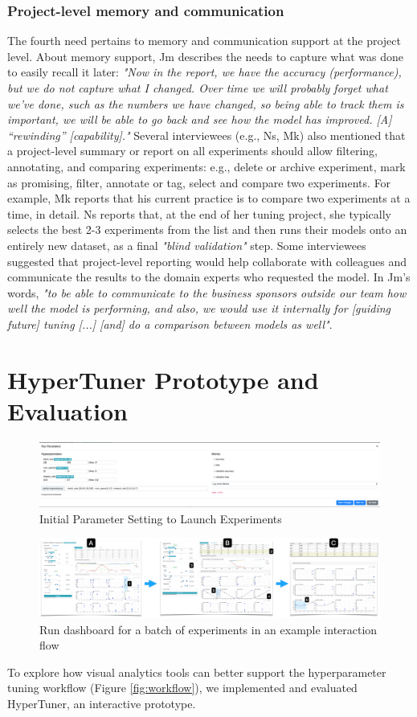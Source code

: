\documentclass[preprint]{vgtc}        %
\begin{document}
\subsubsection{Project-level memory and communication}
The fourth need pertains to memory and communication support at the project level. About memory support, Jm describes the needs to capture what was done to easily recall it later: \textit{"Now in the report, we have the accuracy (performance), but we do not capture what I changed. Over time we will probably forget what we’ve done, such as the numbers we have changed, so being able to track them is important, we will be able to go back and see how the model has improved. [A] “rewinding” [capability]."}
Several interviewees (e.g., Ns, Mk) also mentioned that a project-level summary or report on all experiments should allow filtering, annotating, and comparing experiments: e.g., delete or archive experiment, mark as promising, filter, annotate or tag, select and compare two experiments. For example, Mk reports that his current practice is to compare two experiments at a time, in detail. Ns reports that, at the end of her tuning project, she typically selects the best 2-3 experiments from the list and then runs their models onto an entirely new dataset, as a final \textit{"blind validation"} step. 
Some interviewees suggested that project-level reporting would help collaborate with colleagues and communicate the results to the domain experts who requested the model. In Jm's words, \textit{"to be able to communicate to the business sponsors outside our team how well the model is performing, and also, we would use it internally for [guiding future] tuning [...] [and] do a comparison between models as well"}. 

\section{HyperTuner Prototype and Evaluation}
\begin{figure}
 \includegraphics[width=\textwidth]{pictures/start}
 \caption{Initial Parameter Setting to Launch Experiments}
 \label{fig:start}
\end{figure}
\begin{figure}
 \includegraphics[width=\textwidth]{pictures/global}
 \caption{Run dashboard for a batch of experiments in an example interaction flow}
 \label{fig:global}
\end{figure}
To explore how visual analytics tools can better support the hyperparameter tuning workflow (Figure \ref{fig:workflow}), we implemented and evaluated HyperTuner, an interactive prototype. 
\end{document}
